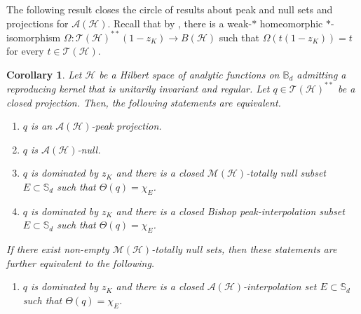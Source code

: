 \documentclass[10pt]{amsart}
\newcommand{\bB}{{\mathbb{B}}}
\newcommand{\bS}{{\mathbb{S}}}
\newcommand{\A}{{\mathcal{A}}}
\renewcommand{\H}{{\mathcal{H}}}
\newcommand{\M}{{\mathcal{M}}}
\newcommand{\T}{{\mathcal{T}}}
\newtheorem{corollary}[lemma]{Corollary}
\theoremstyle{definition}
\begin{document}
The following result closes the circle of results about peak and null sets and projections for $\A(\H)$. Recall that by \cite[Lemma 5.5]{CT2023Henkin}, there is a weak-$*$ homeomorphic $*$-isomorphism $\Omega: \T(\H)^{**}(1-z_K)\to B(\H)$ such that $\Omega(t(1-z_K))=t$ for every $t\in \T(\H)$.

\begin{corollary}\label{C:DHequiv}
Let $\H$ be a Hilbert space of analytic functions on $\bB_d$ admitting  a reproducing kernel that is unitarily invariant and regular. Let $q\in \T(\H)^{**}$ be a closed projection. Then, the following statements are equivalent. 
\begin{enumerate}[{\rm (i)}]
\item $q$ is an $\A(\H)$-peak projection.
\item $q$ is $\A(\H)$-null.
\item $q$ is dominated by $z_K$ and there is a closed $\M(\H)$-totally null subset $E\subset \bS_d$ such that $\Theta(q)=\chi_E$.
\item $q$ is dominated by $z_K$ and there is a closed Bishop peak-interpolation subset $E\subset \bS_d$ such that $\Theta(q)=\chi_E$.
\end{enumerate} 
If there exist non-empty $\M(\H)$-totally null sets, then these statements are further equivalent to the following.
\begin{enumerate}
\item[{\rm (v)}]  $q$ is dominated by $z_K$ and there is a closed $\A(\H)$-interpolation set $E\subset \bS_d$ such that $\Theta(q)=\chi_E$.
\end{enumerate}
\end{corollary}
\end{document}
